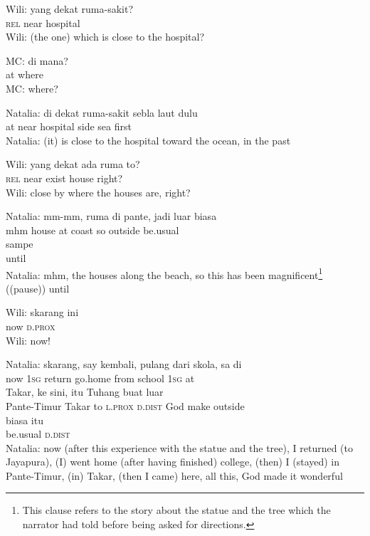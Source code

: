 \ea
\gll   Wili:   yang   dekat   ruma-sakit?\\
  {} \textsc{rel}   near   hospital\\
\glt
Wili: (the one) which is close to the hospital?
\z

\ea
\gll   MC:   di   mana?\\
{}  at   where\\
\glt
MC: where?
\z

\ea
\gll   Natalia:   di   dekat   ruma-sakit   sebla   laut   dulu\\
 {}  at   near   hospital   side   sea   first\\
\glt
Natalia: (it) is close to the hospital toward the ocean, in the past
\z

\ea
\gll   Wili:   yang   dekat   ada   ruma   to?\\
 {} \textsc{rel}   near   exist   house   right?\\
\glt
Wili: close by where the houses are, right?
\z

\ea
\gll   Natalia:    {mm-mm,}   ruma   di   pante,   jadi   luar   biasa\\
  {}    {mhm}   house   at   coast   so   outside   be.usual\\
    {sampe}\\
   {}    {until}\\
\glt
Natalia: mhm, the houses along the beach, so this has been magnificent\footnote{This clause refers to the story about the statue and the tree which the narrator had told before being asked for directions.} ((pause)) until
\z

\ea
\gll   Wili:   skarang   ini\\
 {} now   \textsc{d.prox}\\
\glt
Wili: now!
\z

\ea
\gll   Natalia:    {skarang,}    {say}    {kembali,}    {pulang}    {dari}    {skola,}   sa   di\\
  {} {now}    {\textsc{1sg}}    {return}    {go.home}    {from}    {school}   \textsc{1sg}   at\\
    {Takar,}    {ke}   sini,   itu    {Tuhang}    {buat}    {luar}\\
   {Pante-Timur}    {Takar}    {to}   \textsc{l.prox}   \textsc{d.dist}    {God}    {make}    {outside}\\
\gll  biasa    {itu}\\
  be.usual    {\textsc{d.dist}}\\
\glt
Natalia: now (after this experience with the statue and the tree), I returned (to Jayapura), (I) went home (after having finished) college, (then) I (stayed) in Pante-Timur, (in) Takar, (then I came) here, all this, God made it wonderful
\z %

